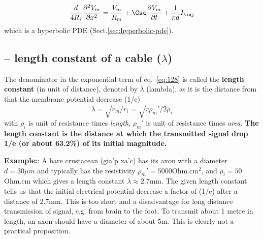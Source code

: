 
\begin{equation}
  \label{eq:cable-equation}
  \frac{d}{4R_i} \frac{\partial ^2V_m}{\partial x^2} = \frac{V_m}{R_m} + 
  \Csc \frac{\partial V_m}{\partial t} + \frac{1}{\pi d} I_\inj
\end{equation}
which is a hyperbolic PDE (Sect.\ref{sec:hyperbolic-pde}).

%   
%   


\subsection{-- length constant of a cable ($\lambda$)}
\label{sec:length-constant}

The denominator in the exponential term of eq.~\eqref{eq:128} is called the
{\bf length constant} (in unit of distance), denoted by $\lambda$ (lambda), as
it is the distance from that the membrane potential decrease (1/e)
\begin{equation}
  \lambda = \sqrt{r_m/r_i} = \sqrt{r\rho_m'/2\rho_i}
\end{equation}
with $\rho_i$ is unit of resistance times {\it length}, $\rho_m'$ is
unit of resistance times {\it area}. {\bf The length constant is the
distance at which the transmitted signal drop 1/e (or about 63.2\%) of
its initial magnitude.}

{\bf Example:}: A bare crustacean (gia'p xa'c) has its axon with a
diameter $d=30\mu m$ and typically has the resistivity $\rho_m' =
5000$Ohm.cm$^2$, and $\rho_i = 50$Ohm.cm which gives a length constant
$\lambda \approx 2.7$mm. The given length constant tells us that the
initial electrical potential decrease a factor of (1/e) after a
distance of 2.7mm. This is too short and a disadvantage for long
distance transmission of signal, e.g. from brain to the foot. To
transmit about 1 metre in length, an axon should have a diameter of
about 5m. This is clearly not a practical proposition.

